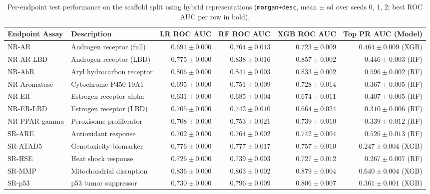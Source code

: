 \begin{table}[t]
\caption{Per-endpoint test performance on the scaffold split using hybrid representations (\texttt{morgan+desc}, mean $\pm$ sd over seeds 0, 1, 2; best ROC AUC per row in bold).}
\label{tab:endpoint_results_scaffold}
\centering\small
\setlength{\tabcolsep}{8pt}
\begin{tabular}{@{}llrrrr@{}}
\toprule
Endpoint Assay & Description & LR ROC AUC & RF ROC AUC & XGB ROC AUC & Top PR AUC (Model) \\
\midrule
NR-AR & Androgen receptor (full) & $0.691 \pm 0.000$ & $\mathbf{0.764 \pm 0.013}$ & $0.723 \pm 0.009$ & $0.464 \pm 0.009$ (XGB) \\
NR-AR-LBD & Androgen receptor (LBD) & $0.775 \pm 0.000$ & $0.838 \pm 0.016$ & $\mathbf{0.857 \pm 0.002}$ & $0.446 \pm 0.003$ (RF) \\
NR-AhR & Aryl hydrocarbon receptor & $0.806 \pm 0.000$ & $\mathbf{0.841 \pm 0.003}$ & $0.833 \pm 0.002$ & $0.596 \pm 0.002$ (RF) \\
NR-Aromatase & Cytochrome P450 19A1 & $0.695 \pm 0.000$ & $\mathbf{0.751 \pm 0.009}$ & $0.728 \pm 0.014$ & $0.367 \pm 0.005$ (RF) \\
NR-ER & Estrogen receptor alpha & $0.631 \pm 0.000$ & $\mathbf{0.685 \pm 0.004}$ & $0.674 \pm 0.011$ & $0.407 \pm 0.005$ (RF) \\
NR-ER-LBD & Estrogen receptor (LBD) & $0.705 \pm 0.000$ & $\mathbf{0.742 \pm 0.010}$ & $0.664 \pm 0.024$ & $0.310 \pm 0.006$ (RF) \\
NR-PPAR-gamma & Peroxisome proliferator & $0.708 \pm 0.000$ & $\mathbf{0.753 \pm 0.021}$ & $0.739 \pm 0.010$ & $0.339 \pm 0.012$ (RF) \\
SR-ARE & Antioxidant response & $0.702 \pm 0.000$ & $\mathbf{0.764 \pm 0.002}$ & $0.742 \pm 0.004$ & $0.526 \pm 0.013$ (RF) \\
SR-ATAD5 & Genotoxicity biomarker & $0.776 \pm 0.000$ & $\mathbf{0.777 \pm 0.017}$ & $0.757 \pm 0.010$ & $0.247 \pm 0.004$ (XGB) \\
SR-HSE & Heat shock response & $0.726 \pm 0.000$ & $\mathbf{0.739 \pm 0.003}$ & $0.727 \pm 0.012$ & $0.267 \pm 0.007$ (RF) \\
SR-MMP & Mitochondrial disruption & $0.836 \pm 0.000$ & $0.863 \pm 0.002$ & $\mathbf{0.879 \pm 0.004}$ & $0.640 \pm 0.004$ (XGB) \\
SR-p53 & p53 tumor suppressor & $0.730 \pm 0.000$ & $0.796 \pm 0.009$ & $\mathbf{0.806 \pm 0.007}$ & $0.361 \pm 0.001$ (XGB) \\
\bottomrule
\end{tabular}
\end{table}

